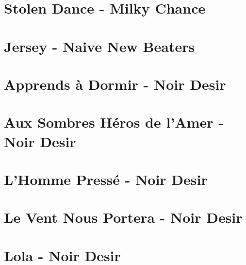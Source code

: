 \documentclass{guitartabs}
\begin{document}
\section{Stolen Dance - Milky Chance}
\begin{guitar}

\end{guitar}


\section{Jersey - Naive New Beaters}
\begin{guitar}

\end{guitar}



\section{Apprends à Dormir - Noir Desir}
\begin{guitar}

\end{guitar}

\section{Aux Sombres Héros de l'Amer - Noir Desir}
\begin{guitar}

\end{guitar}


\section{L'Homme Pressé - Noir Desir}
\begin{guitar}

\end{guitar}

\section{Le Vent Nous Portera - Noir Desir}
\begin{guitar}

\end{guitar}


\section*{Lola - Noir Desir}
\begin{guitar}

\end{guitar}
\end{document}

